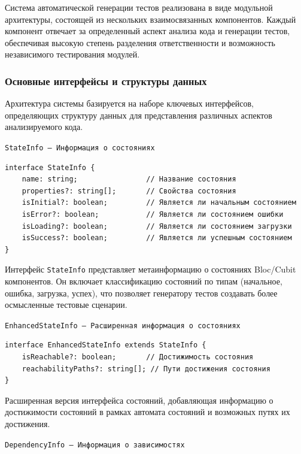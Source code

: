 \documentclass[14pt, russian]{scrartcl}
\begin{document}
Система автоматической генерации тестов реализована в виде модульной архитектуры, состоящей из нескольких взаимосвязанных компонентов. Каждый компонент отвечает за определенный аспект анализа кода и генерации тестов, обеспечивая высокую степень разделения ответственности и возможность независимого тестирования модулей.

\subsubsection{Основные интерфейсы и структуры данных}

Архитектура системы базируется на наборе ключевых интерфейсов, определяющих структуру данных для представления различных аспектов анализируемого кода.

\texttt{StateInfo — Информация о состояниях}

\begin{verbatim}
interface StateInfo {
    name: string;                // Название состояния
    properties?: string[];       // Свойства состояния
    isInitial?: boolean;         // Является ли начальным состоянием
    isError?: boolean;           // Является ли состоянием ошибки
    isLoading?: boolean;         // Является ли состоянием загрузки
    isSuccess?: boolean;         // Является ли успешным состоянием
}
\end{verbatim}

Интерфейс \texttt{StateInfo} представляет метаинформацию о состояниях Bloc/Cubit компонентов. Он включает классификацию состояний по типам (начальное, ошибка, загрузка, успех), что позволяет генератору тестов создавать более осмысленные тестовые сценарии.

\texttt{EnhancedStateInfo — Расширенная информация о состояниях}

\begin{verbatim}
interface EnhancedStateInfo extends StateInfo {
    isReachable?: boolean;       // Достижимость состояния
    reachabilityPaths?: string[]; // Пути достижения состояния
}
\end{verbatim}

Расширенная версия интерфейса состояний, добавляющая информацию о достижимости состояний в рамках автомата состояний и возможных путях их достижения.

\texttt{DependencyInfo — Информация о зависимостях}
\end{document}
